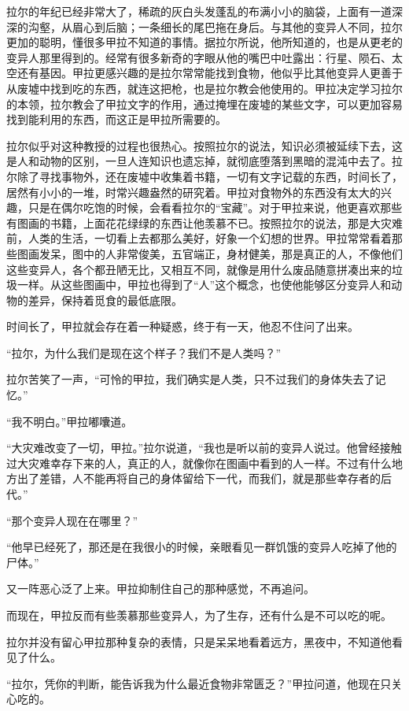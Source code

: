 拉尔的年纪已经非常大了，稀疏的灰白头发蓬乱的布满小小的脑袋，上面有一道深深的沟壑，从眉心到后脑；一条细长的尾巴拖在身后。与其他的变异人不同，拉尔更加的聪明，懂很多甲拉不知道的事情。据拉尔所说，他所知道的，也是从更老的变异人那里得到的。经常有很多新奇的字眼从他的嘴巴中吐露出：行星、陨石、太空还有基因。甲拉更感兴趣的是拉尔常常能找到食物，他似乎比其他变异人更善于从废墟中找到吃的东西，就连这把枪，也是拉尔教会他使用的。甲拉决定学习拉尔的本领，拉尔教会了甲拉文字的作用，通过掩埋在废墟的某些文字，可以更加容易找到能利用的东西，而这正是甲拉所需要的。

拉尔似乎对这种教授的过程也很热心。按照拉尔的说法，知识必须被延续下去，这是人和动物的区别，一旦人连知识也遗忘掉，就彻底堕落到黑暗的混沌中去了。拉尔除了寻找事物外，还在废墟中收集着书籍，一切有文字记载的东西，时间长了，居然有小小的一堆，时常兴趣盎然的研究着。甲拉对食物外的东西没有太大的兴趣，只是在偶尔吃饱的时候，会看看拉尔的“宝藏”。对于甲拉来说，他更喜欢那些有图画的书籍，上面花花绿绿的东西让他羡慕不已。按照拉尔的说法，那是大灾难前，人类的生活，一切看上去都那么美好，好象一个幻想的世界。甲拉常常看着那些图画发呆，图中的人非常俊美，五官端正，身材健美，那是真正的人，不像他们这些变异人，各个都丑陋无比，又相互不同，就像是用什么废品随意拼凑出来的垃圾一样。从这些图画中，甲拉也得到了“人”这个概念，也使他能够区分变异人和动物的差异，保持着觅食的最低底限。

时间长了，甲拉就会存在着一种疑惑，终于有一天，他忍不住问了出来。

“拉尔，为什么我们是现在这个样子？我们不是人类吗？”

拉尔苦笑了一声，“可怜的甲拉，我们确实是人类，只不过我们的身体失去了记忆。”

“我不明白。”甲拉嘟囔道。

“大灾难改变了一切，甲拉。”拉尔说道，“我也是听以前的变异人说过。他曾经接触过大灾难幸存下来的人，真正的人，就像你在图画中看到的人一样。不过有什么地方出了差错，人不能再将自己的身体留给下一代，而我们，就是那些幸存者的后代。”

“那个变异人现在在哪里？”

“他早已经死了，那还是在我很小的时候，亲眼看见一群饥饿的变异人吃掉了他的尸体。”

又一阵恶心泛了上来。甲拉抑制住自己的那种感觉，不再追问。

而现在，甲拉反而有些羡慕那些变异人，为了生存，还有什么是不可以吃的呢。

拉尔并没有留心甲拉那种复杂的表情，只是呆呆地看着远方，黑夜中，不知道他看见了什么。

“拉尔，凭你的判断，能告诉我为什么最近食物非常匮乏？”甲拉问道，他现在只关心吃的。

